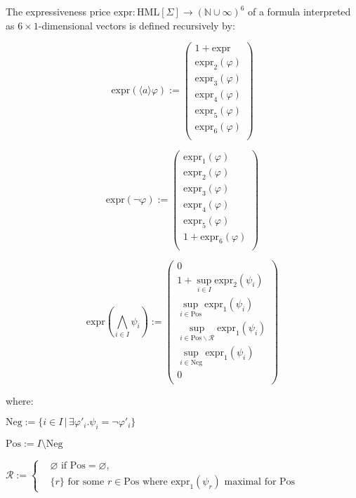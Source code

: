 \begin{isabellebody}
\begin{isamarkuptext}
The expressiveness price $\text{expr} : \text{HML}[\Sigma] \rightarrow (\mathbb{N \cup \infty})^6$ of a formula interpreted as $6 \times 1$-dimensional vectors is defined recursively by:

\[
\text{expr}(\langle a \rangle \varphi) :=
\begin{pmatrix}
1 + \text{expr} \\
\text{expr}_2(\varphi) \\
\text{expr}_3(\varphi) \\
\text{expr}_4(\varphi) \\
\text{expr}_5(\varphi) \\
\text{expr}_6(\varphi) \\
\end{pmatrix}
\]

\[
\text{expr}(\neg \varphi) := 
\begin{pmatrix}
\text{expr}_1(\varphi) \\
\text{expr}_2(\varphi) \\
\text{expr}_3(\varphi) \\
\text{expr}_4(\varphi) \\
\text{expr}_5(\varphi) \\
1 + \text{expr}_6(\varphi) \\
\end{pmatrix}
\]

\[
\text{expr}\left( \bigwedge_{i \in I} \psi_i \right) := 
\begin{pmatrix}
0 \\
1 + \sup_{i \in I} \text{expr}_2(\psi_i) \\
\sup_{i \in \text{Pos}} \text{expr}_1(\psi_i) \\
\sup_{i \in \text{Pos} \backslash \mathcal{R}} \text{expr}_1(\psi_i) \\
\sup_{i \in \text{Neg}} \text{expr}_1(\psi_i) \\
0 \\
\end{pmatrix}
\]

where:

$\text{Neg} := \{i \in I \, | \, \exists \varphi'_i. \psi_i = \neg \varphi'_i\}$

$\text{Pos} := I \setminus \text{Neg}$

$\mathcal{R} := \left\{
\begin{aligned}
&\varnothing \text{ if } \text{Pos} = \varnothing, \\
&\{ r \} \text{ for some } r \in \text{Pos} \text{ where } \text{expr}_1(\psi_r) \text{ maximal for Pos}
\end{aligned}
\right.$


\end{isamarkuptext}
\end{isabellebody}
